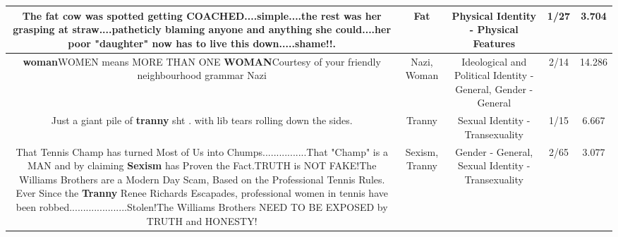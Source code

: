 \documentclass[11pt]{article}
\newlength\mylength
\begin{document}
\begin{center}
\begin{longtable}{|C{.65\mylength}|C{.30\mylength}|C{.12\mylength}|C{.12\mylength}|C{.12\mylength}|}
  \small The \textbf{fat} cow was spotted getting COACHED....simple....the rest was her grasping at straw....patheticly blaming anyone and anything she could....her poor "daughter" now has to live this down.....shame!!.\normalsize   & Fat & Physical Identity - Physical Features & 1/27 & 3.704 \\  \hline
  \small *\textbf{woman}WOMEN means MORE THAN ONE \textbf{WOMAN}Courtesy of your friendly neighbourhood grammar Nazi\normalsize   & Nazi, Woman &  Ideological and Political Identity - General, Gender - General & 2/14 & 14.286 \\  \hline
  \small Just a giant pile of \textbf{tranny} sht . with lib tears rolling down the sides.\normalsize   & Tranny & Sexual Identity - Transexuality & 1/15 & 6.667 \\  \hline
  \small That Tennis Champ has turned Most of Us into Chumps................That "Champ" is a MAN and by claiming \textbf{Sexism} has Proven the Fact.TRUTH is NOT FAKE!The Williams Brothers are a Modern Day Scam, Based on the Professional Tennis Rules. Ever Since the \textbf{Tranny} Renee Richards Escapades, professional women in tennis have been robbed.....................Stolen!The Williams Brothers NEED TO BE EXPOSED by TRUTH and HONESTY!\normalsize   & Sexism, Tranny & Gender - General, Sexual Identity - Transexuality & 2/65 & 3.077 \\  \hline

\end{longtable}
\end{center}
\end{document}
